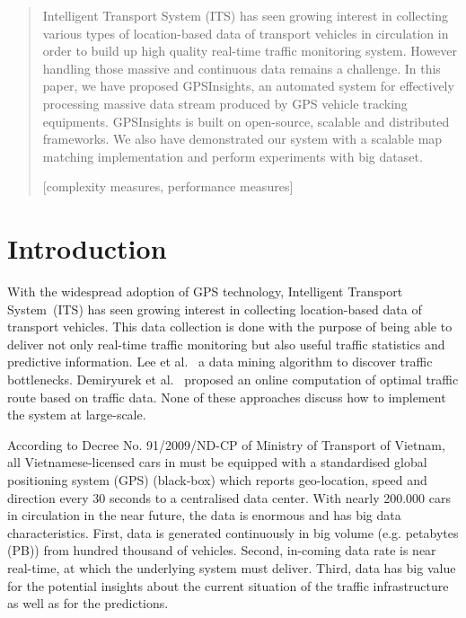 \documentclass{acm_proc_article-sp}
\begin{document}
\maketitle
\begin{abstract}
Intelligent Transport System (ITS) has seen growing interest in collecting various types of location-based data of transport vehicles in circulation in order to build up high quality real-time traffic monitoring system. However handling those massive and continuous data remains a challenge. In this paper, we have proposed GPSInsights, an automated system for effectively processing massive data stream produced by GPS vehicle tracking equipments. GPSInsights is built on open-source, scalable and distributed frameworks. We also have demonstrated our system with a scalable map matching implementation and perform experiments with big dataset. 

[complexity measures, performance measures]


\end{abstract}

\section{Introduction}


With the widespread adoption of GPS technology, Intelligent Transport System~(ITS) has seen growing interest in collecting location-based data of transport vehicles. This data collection is done with the purpose of being able to deliver not only real-time traffic monitoring but also useful traffic statistics and predictive information. Lee et al.~\cite{Lee2011} a data mining algorithm to discover traffic bottlenecks. Demiryurek et al.~\cite{Demiryurek2010} proposed an online computation of optimal traffic route based on traffic data. None of these approaches discuss how to implement the system at large-scale.


According to Decree No. 91/2009/ND-CP of Ministry of Transport of Vietnam, all Vietnamese-licensed cars in must be equipped with a standardised global positioning system (GPS) (black-box) which reports geo-location, speed and direction every 30 seconds to a centralised data center. With nearly 200.000 cars in circulation in the near future, the data is enormous and has big data characteristics. First, data is generated continuously in big volume (e.g. petabytes (PB)) from hundred thousand of vehicles. Second, in-coming data rate is near real-time, at which the underlying system must deliver. Third, data has big value for the potential insights about the current situation of the traffic infrastructure as well as for the predictions. 
\end{document}
